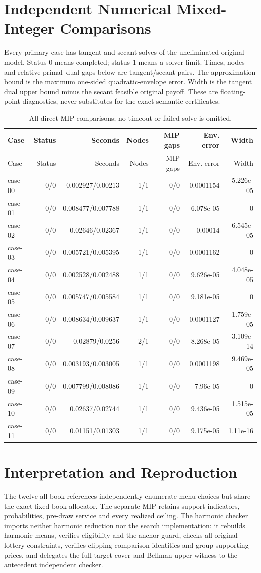 \section{Independent Numerical Mixed-Integer Comparisons}
Every primary case has tangent and secant solves of the uneliminated original model. Status 0 means completed; status 1 means a solver limit. Times, nodes and relative primal--dual gaps below are tangent/secant pairs. The approximation bound is the maximum one-sided quadratic-envelope error. Width is the tangent dual upper bound minus the secant feasible original payoff. These are floating-point diagnostics, never substitutes for the exact semantic certificates.
\begin{longtable}{lrrrrrr}
\caption{All direct MIP comparisons; no timeout or failed solve is omitted.}\label{tab:r48-mip}\\
\toprule Case & Status & Seconds & Nodes & MIP gaps & Env. error & Width\\\midrule\endfirsthead
\toprule Case & Status & Seconds & Nodes & MIP gaps & Env. error & Width\\\midrule\endhead
case-00 & 0/0 & 0.002927/0.00213 & 1/1 & 0/0 & 0.0001154 & 5.226e-05 \\
case-01 & 0/0 & 0.008477/0.007788 & 1/1 & 0/0 & 6.078e-05 & 0 \\
case-02 & 0/0 & 0.02646/0.02367 & 1/1 & 0/0 & 0.00014 & 6.545e-05 \\
case-03 & 0/0 & 0.005721/0.005395 & 1/1 & 0/0 & 0.0001162 & 0 \\
case-04 & 0/0 & 0.002528/0.002488 & 1/1 & 0/0 & 9.626e-05 & 4.048e-05 \\
case-05 & 0/0 & 0.005747/0.005584 & 1/1 & 0/0 & 9.181e-05 & 0 \\
case-06 & 0/0 & 0.008634/0.009637 & 1/1 & 0/0 & 0.0001127 & 1.759e-05 \\
case-07 & 0/0 & 0.02879/0.0256 & 2/1 & 0/0 & 8.268e-05 & -3.109e-14 \\
case-08 & 0/0 & 0.003193/0.003005 & 1/1 & 0/0 & 0.0001198 & 9.469e-05 \\
case-09 & 0/0 & 0.007799/0.008086 & 1/1 & 0/0 & 7.96e-05 & 0 \\
case-10 & 0/0 & 0.02637/0.02744 & 1/1 & 0/0 & 9.436e-05 & 1.515e-05 \\
case-11 & 0/0 & 0.01151/0.01303 & 1/1 & 0/0 & 9.175e-05 & 1.11e-16 \\
\bottomrule\end{longtable}
\section{Interpretation and Reproduction}
The twelve all-book references independently enumerate menu choices but share the exact fixed-book allocator. The separate MIP retains support indicators, probabilities, pre-draw service and every realized ceiling. The harmonic checker imports neither harmonic reduction nor the search implementation: it rebuilds harmonic means, verifies eligibility and the anchor guard, checks all original lottery constraints, verifies clipping comparison identities and group supporting prices, and delegates the full target-cover and Bellman upper witness to the antecedent independent checker.

